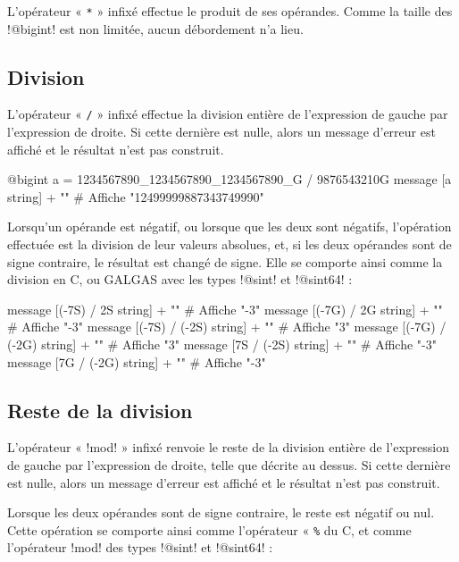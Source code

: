 L'opérateur « \texttt{*} » infixé effectue le produit de ses opérandes. Comme la taille des \ggs!@bigint! est non limitée, aucun débordement n'a lieu.




\subsection{Division}

L'opérateur « \texttt{/} » infixé effectue la division entière de l'expression de gauche par l'expression de droite. Si cette dernière est nulle, alors un message d'erreur est affiché et le résultat n'est pas construit.

\begin{galgas}
@bigint a = 1234567890_1234567890_1234567890_G / 9876543210G
message [a string] + "\n" # Affiche "12499999887343749990"
\end{galgas}

Lorsqu'un opérande est négatif, ou lorsque que les deux sont négatifs, l'opération effectuée est la division de leur valeurs absolues, et, si les deux opérandes sont de signe contraire, le résultat est changé de signe. Elle se comporte ainsi comme la division en C, ou GALGAS avec les types \ggs!@sint! et \ggs!@sint64! :

\begin{galgas}
  message [(-7S) / 2S string] + "\n" # Affiche "-3"
  message [(-7G) / 2G string] + "\n" # Affiche "-3"
  message [(-7S) / (-2S) string] + "\n" # Affiche "3"
  message [(-7G) / (-2G) string] + "\n" # Affiche "3"
  message [7S / (-2S) string] + "\n" # Affiche "-3"
  message [7G / (-2G) string] + "\n" # Affiche "-3"
\end{galgas}



\subsection{Reste de la division}

L'opérateur « \ggs!mod! » infixé renvoie le reste de la division entière de l'expression de gauche par l'expression de droite, telle que décrite au dessus. Si cette dernière est nulle, alors un message d'erreur est affiché et le résultat n'est pas construit.

Lorsque les deux opérandes sont de signe contraire, le reste est négatif ou nul. Cette opération se comporte ainsi comme l'opérateur « \texttt{\%} du C, et comme l'opérateur \ggs!mod! des types \ggs!@sint! et \ggs!@sint64! :

